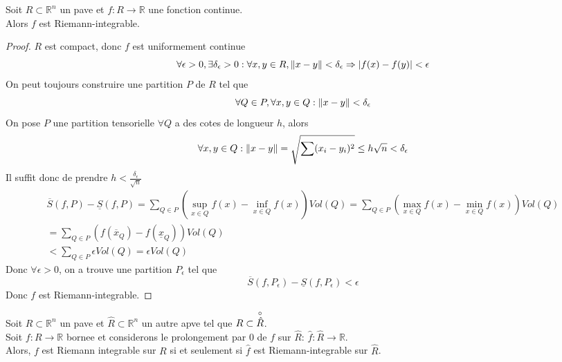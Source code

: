 \documentclass[../main.tex]{subfiles}
\begin{document}
\begin{thm}
Soit $R \subset \mathbb{R}^n$ un pave et $f: R \to \mathbb{R}$ une fonction continue.\\
Alors $f$ est Riemann-integrable.
\end{thm}
\begin{proof}
$R$ est compact, donc $f$ est uniformement continue
\[ 
	\forall \epsilon>0, \exists \delta _\epsilon >0: \forall x,y \in R, \left\lVert x-y\right\rVert <\delta_\epsilon \Rightarrow |f( x) -f( y) | <\epsilon
\]
On peut toujours construire une partition $P$ de $R$ tel que 
\[ 
\forall Q \in P, \forall x,y \in Q: \left\lVert x-y\right\rVert < \delta_\epsilon
\]
On pose $P$ une partition tensorielle $\forall Q $ a des cotes de longueur $h$, alors
\[ 
	\forall x,y \in Q: \left\lVert x-y\right\rVert = \sqrt{ \sum_{}^{ }( x_i-y_i) ^{2}} \leq  h \sqrt{n} < \delta_\epsilon
\]
Il suffit donc de prendre $h < \frac{\delta_\epsilon}{ \sqrt{n} }$ 
\begin{align*}
\overline { S} ( f,P)  - \underline { S} ( f,P)  = \sum_{Q \in P}^{ }( \sup_{x \in Q} f( x) - \inf_{x \in Q} f( x)  ) Vol( Q) = \sum_{Q \in P} (  \max_{x \in Q} f( x) - \min_{x \in Q} f( x) ) Vol( Q) \\
= \sum_{Q \in P}  ( f( \overline{x}_Q ) - f( \underline { x} _Q) ) Vol( Q) \\
< \sum_{Q \in P} \epsilon Vol( Q) = \epsilon Vol( Q) 
\end{align*}
Donc $\forall \epsilon >0$, on a trouve une partition $P_\epsilon$ tel que
\[ 
	\overline { S} ( f,P_\epsilon) - \underline { S} ( f,P_\epsilon) <\epsilon
\]
Donc $f$ est Riemann-integrable.

		
\end{proof}
Soit $R \subset \mathbb{R}^n$ un pave et $\hat{R} \subset \mathbb{R}^n$ un autre apve tel que $R \subset \overset{\circ}{ \hat{R}} $.\\
Soit $f: R \to \mathbb{R}$ bornee et considerons le prolongement par $0$ de $f$ sur $\hat{R}$: $\hat{f}: \hat{R} \to \mathbb{R}$.\\
Alors, $f$ est Riemann integrable sur $R$ si et seulement si $\hat{f}$ est Riemann-integrable sur $\hat{R}$.
\end{document}
